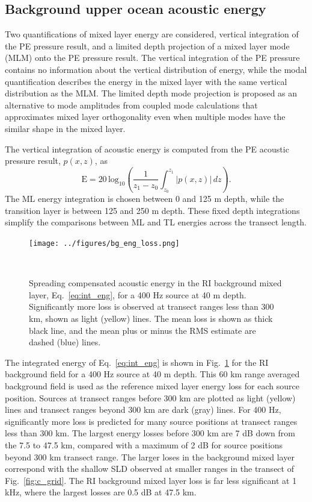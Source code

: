 \documentclass[preprint,NumberedRefs]{JASA}
\begin{document}
\subsection{Background upper ocean acoustic energy}\label{ssec:bg}
Two quantifications of mixed layer energy are considered, vertical integration of the PE pressure result, and a limited depth projection of a mixed layer mode (MLM) onto the PE pressure result. The vertical integration of the PE pressure contains no information about the vertical distribution of energy, while the modal quantification describes the energy in the mixed layer with the same vertical distribution as the MLM. The limited depth mode projection is proposed as an alternative to mode amplitudes from coupled mode calculations that approximates mixed layer orthogonality even when multiple modes have the similar shape in the mixed layer.

The vertical integration of acoustic energy is computed from the PE acoustic pressure result, $p(x, z)$, as
\begin{equation}
        \textrm{E} = 20 \, \textrm{log}_{10} \left( \frac{1}{z_1 - z_0} \int^{z_1}_{z_0} \left| p(x, z) \right| \,  dz \right).
    \label{eq:int_eng}
\end{equation}
The ML energy integration is chosen between 0 and 125 m depth, while the transition layer is between 125 and 250 m depth. These fixed depth integrations simplify the comparisons between ML and TL energies across the transect length.

\begin{figure}
\texttt{[image: ../figures/bg\_eng\_loss.png]}
    \caption{Spreading compensated acoustic energy in the RI background mixed layer, Eq.~\eqref{eq:int_eng}, for a 400 Hz source at 40 m depth. Significantly more loss is observed at transect ranges less than 300 km, shown as light (yellow) lines. The mean loss is shown as thick black line, and the mean plus or minus the RMS estimate are dashed (blue) lines.}
    \label{fig:bg_eng}
\end{figure}
The integrated energy of Eq.~\eqref{eq:int_eng} is shown in Fig.~\ref{fig:bg_eng} for the RI background field for a 400 Hz source at 40 m depth. This 60 km range averaged background field is used as the reference mixed layer energy loss for each source position. Sources at transect ranges before 300 km are plotted as light (yellow) lines and transect ranges beyond 300 km are dark (gray) lines. For 400 Hz, significantly more loss is predicted for many source positions at transect ranges less than 300 km. The largest energy losses before 300 km are 7 dB down from the 7.5 to 47.5 km, compared with a maximum of 2 dB for source positions beyond 300 km transect range. The larger loses in the background mixed layer correspond with the shallow SLD observed at smaller ranges in the transect of Fig.~\ref{fig:c_grid}. The RI background mixed layer loss is far less significant at 1 kHz, where the largest losses are 0.5 dB at 47.5 km.
\end{document}
